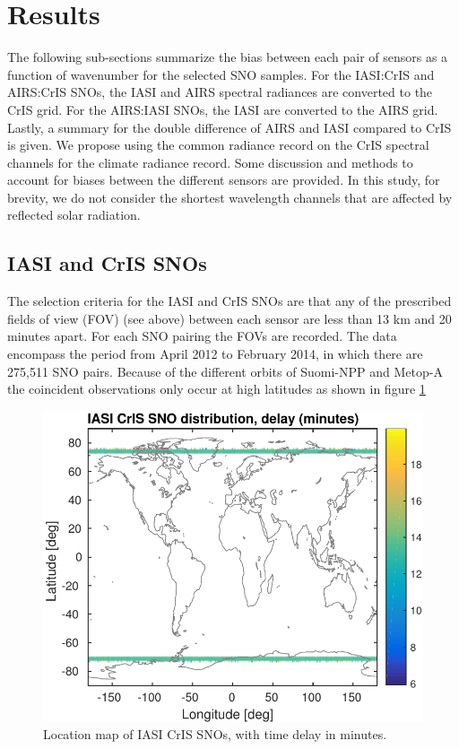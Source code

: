 \documentclass[11pt]{article}
\begin{document}
\section{Results}
\label{sec:orgheadline12}
The following sub-sections summarize the bias between each pair of sensors as a function of wavenumber for the selected SNO samples. For the IASI:CrIS and AIRS:CrIS SNOs, the IASI and AIRS spectral radiances are converted to the CrIS grid.  For the AIRS:IASI SNOs, the IASI are converted to the AIRS grid. Lastly, a summary for the double difference of AIRS and IASI compared to CrIS is given. We propose using the common radiance record on the CrIS spectral channels for the climate radiance record. Some discussion and methods to account for biases between the different sensors are provided. In this study, for brevity, we do not consider the shortest wavelength channels that are affected by reflected solar radiation.

\subsection{IASI and CrIS SNOs}
\label{sec:orgheadline8}
The selection criteria for the IASI and CrIS SNOs are that any of the prescribed fields of view (FOV) (see above) between each sensor are less than 13 km and 20 minutes apart.  For each SNO pairing the FOVs are recorded. The data encompass the period from April 2012 to February 2014, in which there are 275,511 SNO pairs. Because of the different orbits
of Suomi-NPP and Metop-A the coincident observations only occur at high latitudes as
shown in figure \ref{fig:X1}

\begin{figure}[htb]
\centering
\includegraphics[width=.6\linewidth]{./figs/IASI_CRIS_jplSNO_mapDelay.pdf}
\caption{\label{fig:orgparagraph3}
  Location map of IASI CrIS SNOs, with time delay in minutes.}
\label{fig:X1}
\end{figure}
\end{document}
